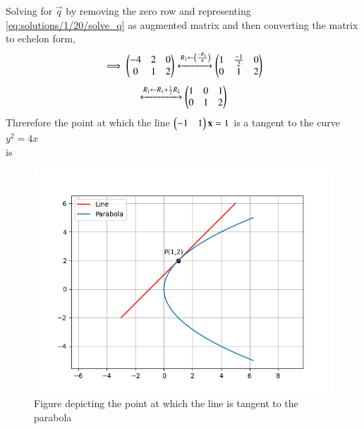 Solving for $\vec{q}$ by removing the zero row and representing \eqref{eq:solutions/1/20/solve_q} as augmented matrix and then converting the matrix to echelon form,
\begin{align}
\implies \begin{pmatrix}-4&2&0\\0&1&2\end{pmatrix} \xleftrightarrow[]{R_1\leftarrow\ensuremath{\left(\frac{-R_1}{4}\right)}} \begin{pmatrix}1&\frac{-1}{2}&0\\0&1&2\end{pmatrix}
\end{align}
\begin{align}
\xleftrightarrow[]{R_1\leftarrow R_1+\frac{1}{2}R_2} \begin{pmatrix}1&0&1\\0&1&2\end{pmatrix}
\end{align}
Threrefore the point at which the line $\begin{pmatrix}-1 & 1\end{pmatrix}\mathbf{x}=1$
is a tangent to the curve $y^2=4x$\\
is \\
\begin{figure}[h!]
	\centering
	\includegraphics[width=\columnwidth]{./solutions/conics/1/20/Figure_1.png}
	\caption{Figure depicting the point at which the line is tangent to the parabola}
	\label{eq:solutions/1/20/fig1}
\end{figure}
